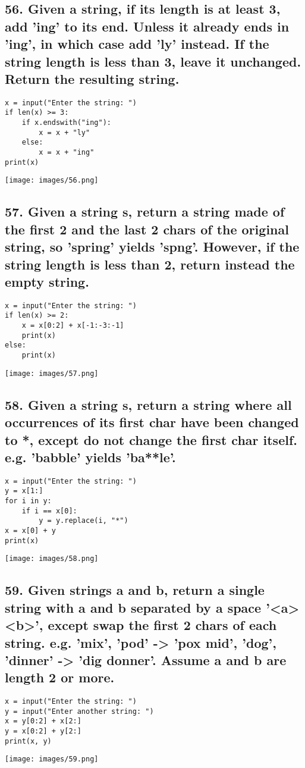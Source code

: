 \documentclass[12pt]{article}
\begin{document}
\subsection*{56. Given a string, if its length is at least 3, add 'ing' to its end. Unless it already ends in 'ing', in which case add 'ly' instead. If the string length is less than 3, leave it unchanged. Return the resulting string.}
\begin{verbatim}
x = input("Enter the string: ")
if len(x) >= 3:
    if x.endswith("ing"):
        x = x + "ly"
    else:
        x = x + "ing"
print(x)
\end{verbatim}
\texttt{[image: images/56.png]}

\subsection*{57. Given a string s, return a string made of the first 2 and the last 2 chars of the original string, so 'spring' yields 'spng'. However, if the string length is less than 2, return instead the empty string.}
\begin{verbatim}
x = input("Enter the string: ")
if len(x) >= 2:
    x = x[0:2] + x[-1:-3:-1]
    print(x)
else:
    print(x)
\end{verbatim}
\texttt{[image: images/57.png]}

\subsection*{58. Given a string s, return a string where all occurrences of its first char have been changed to *, except do not change the first char itself. e.g. 'babble' yields 'ba**le'.}
\begin{verbatim}
x = input("Enter the string: ")
y = x[1:]
for i in y:
    if i == x[0]:
        y = y.replace(i, "*")
x = x[0] + y
print(x)
\end{verbatim}
\texttt{[image: images/58.png]}

\subsection*{59. Given strings a and b, return a single string with a and b separated by a space '<a> <b>', except swap the first 2 chars of each string. e.g. 'mix', 'pod' -> 'pox mid', 'dog', 'dinner' -> 'dig donner'. Assume a and b are length 2 or more.}
\begin{verbatim}
x = input("Enter the string: ")
y = input("Enter another string: ")
x = y[0:2] + x[2:]
y = x[0:2] + y[2:]
print(x, y)
\end{verbatim}
\texttt{[image: images/59.png]}
\end{document}
